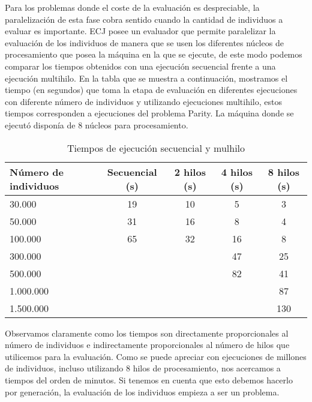 \label{resultados-parity}

Para los problemas donde el coste de la evaluación es despreciable, la paralelizaci\'on de esta fase cobra sentido cuando la cantidad de individuos a evaluar es importante. ECJ posee un evaluador que permite paralelizar la evaluación de los individuos de manera que se usen los diferentes núcleos de procesamiento que posea la m\'aquina en la que se ejecute, de este modo podemos comparar los tiempos obtenidos con una ejecución secuencial frente a una ejecuci\'on multihilo. En la tabla que se muestra a continuación, mostramos el tiempo (en segundos) que toma la etapa de evaluación en diferentes ejecuciones con diferente n\'umero de individuos y utilizando ejecuciones multihilo, estos tiempos corresponden a ejecuciones del problema Parity. La m\'aquina donde se ejecut\'o disponía de 8 núcleos para procesamiento.

\begin{table}[H]
  \begin{center}
    \begin{center}
    \begin{tabular}{l | c c c c}
    N\'umero de individuos & Secuencial (s) & 2 hilos (s) & 4 hilos (s) & 8 hilos (s) \\ \hline
    30.000 & 19 & 10 & 5 & 3\\
    50.000 & 31 & 16 & 8 & 4\\
    100.000 & 65 & 32 & 16 & 8\\
    300.000 & & & 47 & 25\\
    500.000 & & & 82 & 41\\
    1.000.000 & & & & 87\\
    1.500.000 & & & & 130\\
    \end{tabular}
    \end{center}
    \caption{Tiempos de ejecución secuencial y mulhilo}
    \label{tabla_tiempos_ecj}
  \end{center}
\end{table}

Observamos claramente como los tiempos son directamente proporcionales al n\'umero de individuos e indirectamente proporcionales al n\'umero de hilos que utilicemos para la evaluación. Como se puede apreciar con ejecuciones de millones de individuos, incluso utilizando 8 hilos de procesamiento, nos acercamos a tiempos del orden de minutos. Si tenemos en cuenta que esto debemos hacerlo por generación, la evaluación de los individuos empieza a ser un problema. 

